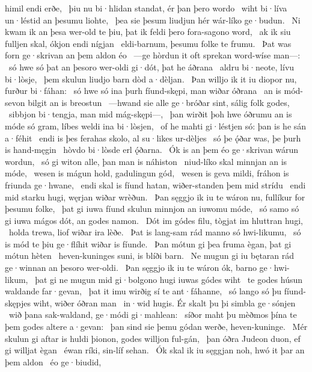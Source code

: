 himil endi erðe, \hld\ þiu nu bi·hlidan standat,
ér þan þero wordo \hld\ wiht bi·líva
un·léstid an þesumu liohte, \hld\ þea sie þesum liudjun hér
wár-líko ge·budun. \hld\ Ni kwam ik an þesa wer-old te þiu,
þat ik feldi þero fora-sagono word, \hld\ ak ik siu fulljen skal,
ókjon endi nígjan \hld\ eldi-barnum,
þesumu folke te frumu. \hld\ Þat was forn ge·skrivan
an þem aldon éo \hld\ —ge hòrdun it oft sprekan
word-wíse man—: \hld\ só hwe só þat an þesoro wer-oldi gi·dót,
þat he áðrana \hld\ aldru bi·neote,
lívu bi·lòsje, \hld\ þem skulun liudjo barn
dòd a·dèljan. \hld\ Þan willjo ik it iu diopor nu,
furður bi·fáhan: \hld\ só hwe só ina þurh fíund-skępi,
man wiðar óðrana \hld\ an is mód-sevon
bilgit an is breostun \hld\ —hwand sie alle ge·bróðar sint,
sálig folk godes, \hld\ sibbjon bi·tengja,
man mid mág-skępi—, \hld\ þan wirðit þoh hwe óðrumu an is móde só gram,
líbes weldi ina bi·lòsjen, \hld\ of he mahti gi·léstjen só:
þan is he sán a·féhit \hld\ endi is þes ferahas skolo,
al su·likes ur-dèljes \hld\ só þe ǫ́ðar was,
þe þurh is hand-męgin \hld\ hòvdo bi·lòsde
erl ǫ́ðarna. \hld\ Ók is an þem éo ge·skrivan
wárun wordun, \hld\ só gi witon alle,
þan man is náhiston \hld\ niud-líko skal
minnjan an is móde, \hld\ wesen is mágun hold,
gadulingun gód, \hld\ wesen is geva mildi,
fráhon is friunda ge·hwane, \hld\ endi skal is fíund hatan,
wiðer-standen þem mid strídu \hld\ endi mid starku hugi,
węrjan wiðar wrèðun. \hld\ Þan sęggjo ik iu te wáron nu,
fullíkur for þesumu folke, \hld\ þat gi iuwa fíund skulun
minnjon an iuwomu móde, \hld\ só samo só gi iuwa mágos dót,
an godes namon. \hld\ Dót im gódes filu,
tògjat im hluttran hugi, \hld\ holda trewa,
liof wiðar ira lèðe. \hld\ Þat is lang-sam rád
manno só hwi-likumu, \hld\ só is mód te þiu
ge·flíhit wiðar is fíunde. \hld\ Þan mótun gi þea fruma ègan,
þat gi mótun hèten \hld\ heven-kuninges suni,
is blíði barn. \hld\ Ne mugun gi iu bętaran rád
ge·winnan an þesoro wer-oldi. \hld\ Þan sęggjo ik iu te wáron ók,
barno ge·hwi-likum, \hld\ þat gi ne mugun mid gi·bolgono hugi
iuwas gódes wiht \hld\ te godes húsun
waldande far·gevan, \hld\ þat it imu wirðig sí
te ant·fáhanne, \hld\ só lango só þu fíund-skępjes wiht,
wiðer óðran man \hld\ in·wid hugis.
Ér skalt þu þi simbla ge·sónjen \hld\ wið þana sak-waldand,
ge·módi gi·mahlean: \hld\ síðor maht þu mèðmos þína
te þem godes altere a·gevan: \hld\ þan sind sie þemu gódan werðe,
heven-kuninge. \hld\ Mér skulun gi aftar is huldi þionon,
godes willjon ful-gán, \hld\ þan óðra Judeon duon,
ef gi willjat ègan \hld\ éwan ríki,
sin-líf sehan. \hld\ Ók skal ik iu sęggjan noh,
hwó it þar an þem aldon \hld\ éo ge·biudid,

